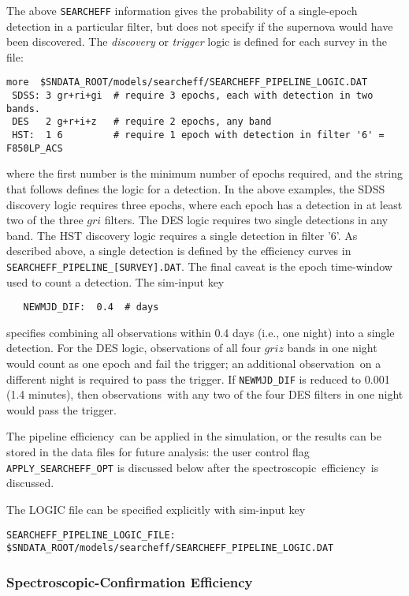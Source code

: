 \documentclass[12pt]{article}
\newcommand{\eff}{efficiency}
\newcommand{\spec}{spectroscopic}
\newcommand{\obs}{observation}
\newcommand{\obss}{observations}
\begin{document}
{\clearpage
The above {\tt SEARCHEFF} information gives the probability
of a single-epoch detection in a particular filter, but does
not specify if the supernova would have been discovered.
The {\it discovery} or {\it trigger} logic is defined for each 
survey in the file:
%
\begin{Verbatim}[frame=single]
 more  $SNDATA_ROOT/models/searcheff/SEARCHEFF_PIPELINE_LOGIC.DAT
 SDSS: 3 gr+ri+gi  # require 3 epochs, each with detection in two bands.
 DES   2 g+r+i+z   # require 2 epochs, any band
 HST:  1 6         # require 1 epoch with detection in filter '6' = F850LP_ACS
\end{Verbatim}
where the first number is the minimum number of epochs required,
and the string that follows defines the logic for a detection.
In the above examples, the SDSS discovery logic requires
three epochs, where each epoch has a detection in at least
two of the three $gri$ filters. 
The DES logic requires two single detections in any band.
The HST discovery logic requires a single detection in filter '6'.
As described above, a single detection is defined by the 
efficiency curves in {\tt SEARCHEFF\_PIPELINE\_[SURVEY].DAT}.
The final caveat is the epoch time-window used to 
count a detection. The sim-input key
\begin{verbatim}
   NEWMJD_DIF:  0.4  # days
\end{verbatim}
%
specifies combining all observations within 0.4 days (i.e., one night)
into a single detection. For the DES logic, observations of
all four $griz$ bands in one night would count as one epoch
and fail the trigger; an additional \obs\ on a different night
is required to pass the trigger.  If {\tt NEWMJD\_DIF} is
reduced to 0.001 (1.4 minutes), then \obss\ with any two of the
four DES filters in one night would pass the trigger.


The pipeline \eff\ can be applied in the simulation,
or the results can be stored in the data files for future
analysis: the user control flag {\tt APPLY\_SEARCHEFF\_OPT} 
is discussed below after the \spec\ \eff\ is discussed.

The LOGIC file can be specified explicitly with sim-input key
%
\begin{verbatim}
SEARCHEFF_PIPELINE_LOGIC_FILE:  $SNDATA_ROOT/models/searcheff/SEARCHEFF_PIPELINE_LOGIC.DAT
\end{verbatim}



\subsubsection{Spectroscopic-Confirmation Efficiency }
\label{sss:eff_spec}

}
\end{document}
